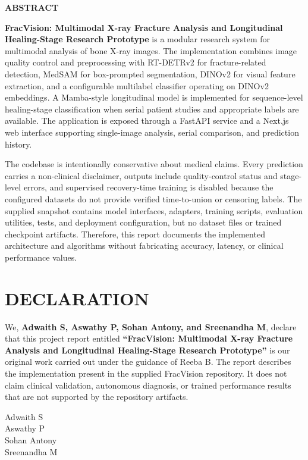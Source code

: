 \documentclass[12pt,a4paper]{article}
\newcommand{\frontmattertitle}[1]{%
  \begin{center}{\fontsize{13.2pt}{16pt}\selectfont\bfseries #1\par}\end{center}%
  \vspace{10pt}%
}
\newcommand{\bodytextstyle}{\fontsize{11.3pt}{25.8pt}\selectfont}
\begin{document}
\thispagestyle{empty}
\frontmattertitle{ABSTRACT}
\vspace{6pt}
\bodytextstyle
\textbf{FracVision: Multimodal X-ray Fracture Analysis and Longitudinal Healing-Stage Research Prototype} is a modular research system for multimodal analysis of bone X-ray images. The implementation combines image quality control and preprocessing with RT-DETRv2 for fracture-related detection, MedSAM for box-prompted segmentation, DINOv2 for visual feature extraction, and a configurable multilabel classifier operating on DINOv2 embeddings. A Mamba-style longitudinal model is implemented for sequence-level healing-stage classification when serial patient studies and appropriate labels are available. The application is exposed through a FastAPI service and a Next.js web interface supporting single-image analysis, serial comparison, and prediction history.

The codebase is intentionally conservative about medical claims. Every prediction carries a non-clinical disclaimer, outputs include quality-control status and stage-level errors, and supervised recovery-time training is disabled because the configured datasets do not provide verified time-to-union or censoring labels. The supplied snapshot contains model interfaces, adapters, training scripts, evaluation utilities, tests, and deployment configuration, but no dataset files or trained checkpoint artifacts. Therefore, this report documents the implemented architecture and algorithms without fabricating accuracy, latency, or clinical performance values.
\newpage
\iffalse
\section*{DECLARATION}
We, \textbf{Adwaith S, Aswathy P, Sohan Antony, and Sreenandha M}, declare that this project report entitled \textbf{“FracVision: Multimodal X-ray Fracture Analysis and Longitudinal Healing-Stage Research Prototype”} is our original work carried out under the guidance of Reeba B. The report describes the implementation present in the supplied FracVision repository. It does not claim clinical validation, autonomous diagnosis, or trained performance results that are not supported by the repository artifacts.

\vspace{18pt}
\hfill Adwaith S\\
\hfill Aswathy P\\
\hfill Sohan Antony\\
\hfill Sreenandha M
\end{document}
